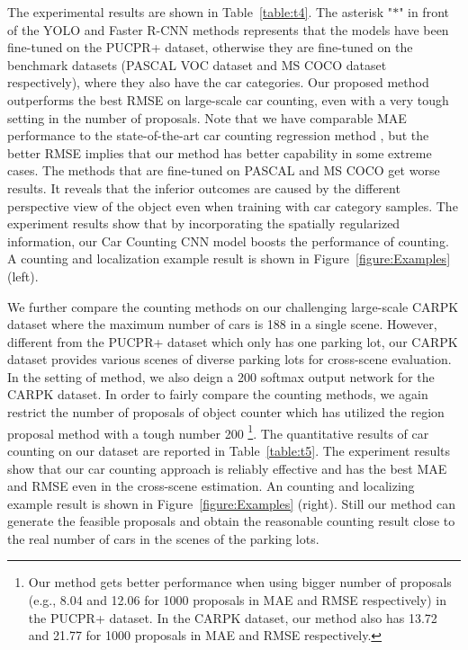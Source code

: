 \documentclass[10pt,twocolumn,letterpaper]{article}
\begin{document}
The experimental results are shown in Table~\ref{table:t4}. The asterisk "$*$" in front of the YOLO and Faster R-CNN methods represents that the models have been fine-tuned on the PUCPR+ dataset, otherwise they are fine-tuned on the benchmark datasets (PASCAL VOC dataset and MS COCO dataset respectively), where they also have the car categories. 
Our proposed method outperforms the best RMSE on large-scale car counting, even with a very tough setting in the number of proposals. Note that we have comparable MAE performance to the state-of-the-art car counting regression method \cite{04_mundhenk2016large}, but the better RMSE implies that our method has better capability in some extreme cases. 
The methods that are fine-tuned on PASCAL and MS COCO get worse results. It reveals that the inferior outcomes are caused by the different perspective view of the object even when training with car category samples. The experiment results show that by incorporating the spatially regularized information, our Car Counting CNN model boosts the performance of counting. A counting and localization example result is shown in Figure~\ref{figure:Examples} (left).


We further compare the counting methods on our challenging large-scale CARPK dataset where the maximum number of cars is 188 in a single scene. However, different from the PUCPR+ dataset which only has one parking lot, our CARPK dataset provides various scenes of diverse parking lots for cross-scene evaluation. In the setting of \cite{04_mundhenk2016large} method, we also deign a 200 softmax output network for the CARPK dataset. In order to fairly compare the counting methods, we again restrict the number of proposals of object counter which has utilized the region proposal method with a tough number 200 \footnote{Our method gets better performance when using bigger number of proposals (e.g., 8.04 and 12.06 for 1000 proposals in MAE and RMSE respectively) in the PUCPR+ dataset. In the CARPK dataset, our method also has 13.72 and 21.77 for 1000 proposals in MAE and RMSE respectively.}. The quantitative results of car counting on our dataset are reported in Table~\ref{table:t5}. The experiment results show that our car counting approach is reliably effective and has the best MAE and RMSE even in the cross-scene estimation. An counting and localizing example result is shown in Figure~\ref{figure:Examples} (right). Still our method can generate the feasible proposals and obtain the reasonable counting result close to the real number of cars in the scenes of the parking lots.
\end{document}
